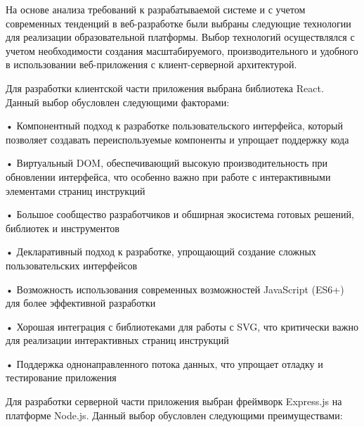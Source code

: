 \subtitlespace

{\gostFont

  \par \redline На основе анализа требований к разрабатываемой системе и с учетом современных тенденций в веб-разработке были выбраны следующие технологии для реализации образовательной платформы. Выбор технологий осуществлялся с учетом необходимости создания масштабируемого, производительного и удобного в использовании веб-приложения с клиент-серверной архитектурой.

  \par \redline Для разработки клиентской части приложения выбрана библиотека React. Данный выбор обусловлен следующими факторами:
  
  \par \redline • Компонентный подход к разработке пользовательского интерфейса, который позволяет создавать переиспользуемые компоненты и упрощает поддержку кода
  \par \redline • Виртуальный DOM, обеспечивающий высокую производительность при обновлении интерфейса, что особенно важно при работе с интерактивными элементами страниц инструкций
  \par \redline • Большое сообщество разработчиков и обширная экосистема готовых решений, библиотек и инструментов
  \par \redline • Декларативный подход к разработке, упрощающий создание сложных пользовательских интерфейсов
  \par \redline • Возможность использования современных возможностей JavaScript (ES6+) для более эффективной разработки
  \par \redline • Хорошая интеграция с библиотеками для работы с SVG, что критически важно для реализации интерактивных страниц инструкций
  \par \redline • Поддержка однонаправленного потока данных, что упрощает отладку и тестирование приложения

  \par \redline Для разработки серверной части приложения выбран фреймворк Express.js на платформе Node.js. Данный выбор обусловлен следующими преимуществами:
  
}
